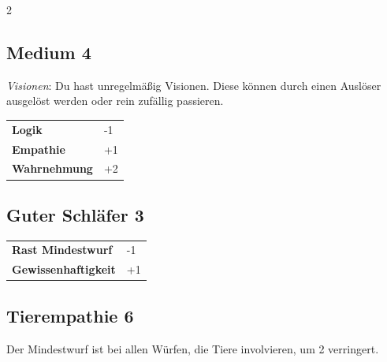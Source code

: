 \begin{multicols}{2}
\begin{tcolorbox}
    \subsection*{Medium \hfill \small{4 }}
    \tcblower
\textit{Visionen}: Du hast unregelmäßig Visionen. Diese können durch einen Auslöser ausgelöst werden oder rein zufällig passieren.


\vspace{3mm}

\begin{tabular}{@{}ll@{}}
    \textbf{Logik} & -1\\
    \textbf{Empathie} & +1\\
    \textbf{Wahrnehmung} & +2\\
\end{tabular}


\end{tcolorbox}

\begin{tcolorbox}
    \subsection*{Guter Schläfer \hfill \small{3 }}
    \tcblower




\begin{tabular}{@{}ll@{}}
    \textbf{Rast Mindestwurf} & -1\\
    \textbf{Gewissenhaftigkeit} & +1\\
\end{tabular}


\end{tcolorbox}

\begin{tcolorbox}
    \subsection*{Tierempathie \hfill \small{6 }}
    \tcblower
Der Mindestwurf ist bei allen Würfen, die Tiere involvieren, um 2 verringert.



\end{tcolorbox}
\end{multicols}
